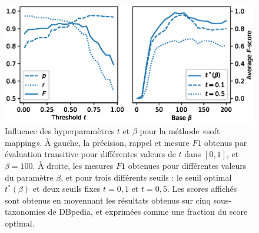 \begin{figure}
    \centering
    \includegraphics[width=\textwidth]{fig/plot/hp_results.eps}
    \caption[Influence des paramètres $t$ et $\beta$]{Influence des hyperparamètres $t$ et $\beta$ pour la méthode «soft mapping». À gauche, la précision, rappel et mesure $F1$ obtenus par évaluation transitive pour différentes valeurs de $t$ dans $[0, 1]$, et $\beta = 100$. À droite, les mesures $F1$ obtenues pour différentes valeurs du paramètre $\beta$, et pour trois différents seuils : le seuil optimal $t^*(\beta)$ et deux seuils fixes $t=0,1$ et $t=0,5$. Les scores affichés sont obtenus en moyennant les résultats obtenus sur cinq sous-taxonomies de DBpedia, et exprimées comme une fraction du score optimal.
    }
    \label{fig:t-search-1}
\end{figure}

